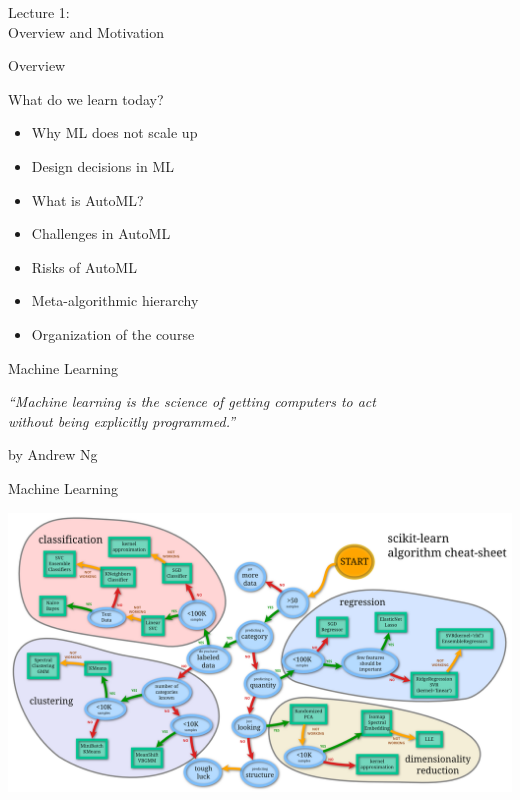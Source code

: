 \begin{frame}[c]{}

\centering
\huge
Lecture 1:\\
Overview and Motivation
\end{frame}
\begin{frame}[c]{Overview}

What do we learn today?

\begin{itemize}
  \item Why ML does not scale up
  \item Design decisions in ML 
  \item What is AutoML? 
  \item Challenges in AutoML
  \item Risks of AutoML
  \item Meta-algorithmic hierarchy 
  \item Organization of the course
\end{itemize}

\end{frame}
\begin{frame}[c]{Machine Learning}

\centering
\textit{``Machine learning is the science of getting computers to act\\
 without being explicitly programmed.''}

\hfill by Andrew Ng

\end{frame}
\begin{frame}[c]{Machine Learning}

\includegraphics[width=1.0\textwidth]{images/sklearn-cheat}

\end{frame}
